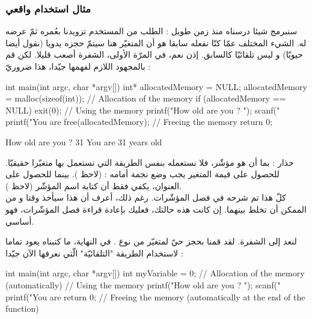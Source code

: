 \subsubsection{مثال استخدام واقعي}

سنبرمج شيئا درسناه منذ زمن طويل : الطلب من المستخدم تزويدنا بعُمره ثمّ عرضه له. الشيء المختلف عمّا كنّا نفعله سابقا هو أن المتغيّر هنا سيتمّ حجزه يدويا (نقول أيضا حيويّا) و ليس تلقائيّا كالسابق. إذن نعم، في المرّة الأولى، الشفرة أصعب قليلا. لكن قم بالمجهود اللازم لفهمها جيّدا، هذا ضروريّ :

\begin{Csource}
int main(int argc, char *argv[])
{
	int* allocatedMemory = NULL;
	allocatedMemory = malloc(sizeof(int)); // Allocation of the memory
	if (allocatedMemory == NULL)
	{
		exit(0);
	}
	// Using the memory
	printf("How old are you ? ");
	scanf("%
	printf("You are %
	free(allocatedMemory); // Freeing the memory
	 return 0;
}
\end{Csource}

\begin{Console}
How old are you  ? 31
You are 31 years old
\end{Console}

\begin{warning}
حذار : بما أن
هو مؤشّر، فلا نستعمله بنفس الطريقة التي نستعمل بها متغيّرا حقيقيّا. للحصول على قيمة المتغير يجب وضع نجمة أمامه :
(لاحظ
).
بينما للحصول على العنوان، يكفي فقط أن كتابة اسم المؤشّر
(لاحظ
).\\
كلّ هذا تم شرحه في فصل المؤشّرات. رغم ذلك، أعرف أن هذا سيأخذ وقتا و من الممكن أن تخلط بينهما. إن كانت هذه حالتك، فعليك بإعادة قراءة فصل المؤشّرات، فهو أساسي.
\end{warning}

لنعد إلى الشفرة. لقد قمنا بحجز حيّ لمتغيّر من نوع
.
في النهاية، ما كتبناه يعود تماما لاستخدام الطريقة
"التلقائيّة" الّتي نعرفها الآن جيّدا :

\begin{Csource}
int main(int argc, char *argv[])
{
	int myVariable = 0; // Allocation of the memory (automatically)
	// Using the memory
	printf("How old are you ? ");
	scanf("%
	printf("You are %
	return 0;
} // Freeing the memory (automatically at the end of the function)
\end{Csource}

